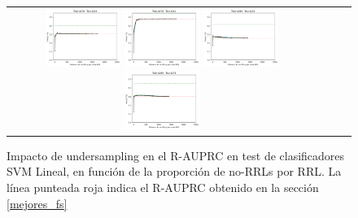 \begin{figure}[h!]
\begin{tabular}{cccc}
\includegraphics[width=0.25\textwidth]{Kap7/train=b278_test=b234_linear_individual_curves.png}  \includegraphics[width=0.25\textwidth]{Kap7/train=b278_test=b261_linear_individual_curves.png} 
 \includegraphics[width=0.25\textwidth]{Kap7/train=b360_test=b234_linear_individual_curves.png}  \includegraphics[width=0.25\textwidth]{Kap7/train=b360_test=b278_linear_individual_curves.png} 
\end{tabular}
\caption{Impacto de undersampling en el R-AUPRC en test de clasificadores SVM Lineal, en función de la proporción de no-RRLs por RRL. La línea punteada roja indica el R-AUPRC obtenido en la sección \protect\ref{mejores_fs}}
\label{fig:svml_undersample}
\end{figure}


